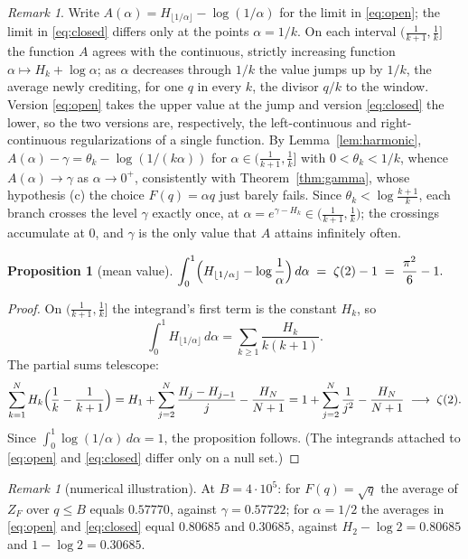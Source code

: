 \documentclass[11pt]{amsart}
\newtheorem{proposition}[theorem]{Proposition}
\theoremstyle{remark}
\newtheorem{remark}[theorem]{Remark}
\newcommand{\eul}{\gamma}
\begin{document}
\begin{remark}\label{rem:oscillation}
Write $A(\alpha)=H_{\lfloor1/\alpha\rfloor}-\log(1/\alpha)$ for the
limit in \eqref{eq:open}; the limit in \eqref{eq:closed} differs only
at the points $\alpha=1/k$.  On each interval
$\bigl(\tfrac1{k+1},\tfrac1k\bigr]$ the function $A$ agrees with the
continuous, strictly increasing function
$\alpha\mapsto H_{k}+\log\alpha$; as $\alpha$ decreases through $1/k$
the value jumps up by $1/k$, the average newly crediting, for one $q$
in every $k$, the divisor $q/k$ to the window.  Version
\eqref{eq:open} takes the upper value at the jump and version
\eqref{eq:closed} the lower, so the two versions are, respectively,
the left-continuous and right-continuous regularizations of a single
function.  By Lemma~\ref{lem:harmonic},
$A(\alpha)-\eul=\theta_{k}-\log(1/(k\alpha))$ for
$\alpha\in(\tfrac1{k+1},\tfrac1k]$ with $0<\theta_{k}<1/k$, whence
$A(\alpha)\to\eul$ as $\alpha\to0^{+}$, consistently with
Theorem~\ref{thm:gamma}, whose hypothesis (c) the choice $F(q)=\alpha q$
just barely fails.  Since $\theta_{k}<\log\frac{k+1}{k}$, each branch
crosses the level $\eul$ exactly once, at
$\alpha=e^{\eul-H_{k}}\in\bigl(\tfrac1{k+1},\tfrac1k\bigr)$; the
crossings accumulate at $0$, and $\eul$ is the only value that $A$
attains infinitely often.
\end{remark}

\begin{proposition}[mean value]\label{prop:mean}
$\displaystyle
\int_{0}^{1}\Bigl(H_{\lfloor1/\alpha\rfloor}
-\log\frac1\alpha\Bigr)\,d\alpha
\;=\;\zeta(2)-1
\;=\;\frac{\pi^{2}}{6}-1 .$
\end{proposition}

\begin{proof}
On $\bigl(\tfrac1{k+1},\tfrac1k\bigr]$ the integrand's first term is
the constant $H_{k}$, so
\[
\int_{0}^{1}H_{\lfloor1/\alpha\rfloor}\,d\alpha
=\sum_{k\ge1}\frac{H_{k}}{k(k+1)} .
\]
The partial sums telescope:
\[
\sum_{k=1}^{N}H_{k}\Bigl(\frac1k-\frac1{k+1}\Bigr)
=H_{1}+\sum_{j=2}^{N}\frac{H_{j}-H_{j-1}}{j}-\frac{H_{N}}{N+1}
=1+\sum_{j=2}^{N}\frac1{j^{2}}-\frac{H_{N}}{N+1}
\;\longrightarrow\;\zeta(2).
\]
Since $\int_{0}^{1}\log(1/\alpha)\,d\alpha=1$, the proposition
follows.  (The integrands attached to \eqref{eq:open} and
\eqref{eq:closed} differ only on a null set.)
\end{proof}

\begin{remark}[numerical illustration]\label{rem:numerics}
At $B=4\cdot10^{5}$: for $F(q)=\sqrt q$ the average of $Z_{F}$ over
$q\le B$ equals $0.57770$, against $\eul=0.57722$; for $\alpha=1/2$
the averages in \eqref{eq:open} and \eqref{eq:closed} equal $0.80685$
and $0.30685$, against $H_{2}-\log2=0.80685$ and $1-\log2=0.30685$.
\end{remark}
\end{document}
